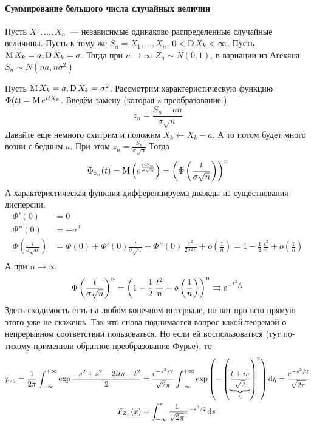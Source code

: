\documentclass[12pt,ebook]{../../../notes}
\begin{document}
\paragraph{Суммирование большого числа случайных величин}
\label{par:stat::randlimsum}
\flame\underdev\sour

\begin{thrm}\label{thrm:stat::randlimsum::sum}
  Пусть $X_1, \dotsc, X_n$~--- независимые одинаково распределённые случайные величины. Пусть к
  тому же $S_n = X_1, \dotsc, X_n$, $0 < \operatorname{D} X_k < \infty$.
  Пусть $\operatorname{M} X_k = a, \operatorname{D} X_k = \sigma$. Тогда при $n\to \infty$ $Z_n \sim N(0,1)$,
  в вариации из Агекяна $S_n \sim N(na,n\sigma^2)$
\end{thrm}
\begin{ittproof}
  Пусть $\operatorname{M} X_k = a, \operatorname{D} X_k = \sigma^2$.
  Рассмотрим характеристическую функцию $\Phi(t) = \operatorname{M} e^{itX_k}$. Введём замену (которая
  z-преобразование.):
  \[
    z_n = \frac{S_n - a n}{\sigma \sqrt n}
  \]
  Давайте ещё немного схитрим и положим $X_k \gets X_k- a$. А то потом будет много возни с бедным
  $a$. При этом $z_n = \frac{S_n}{\sigma \sqrt n}$
  Тогда
  \[
    \Phi_{z_n} (t) = \operatorname{M} \left(e^{\frac{itS_n}{\sigma\sqrt n}} \right)=
    \left(\Phi\left(\frac{t}{\sigma \sqrt n} \right)\right)^n 
  \]
  А характеристическая функция дифференцируема дважды из существования дисперсии.
  \begin{align*}
    \Phi'(0) &= 0 \\
    \Phi''(0) &= - \sigma^2 \\
    \Phi\left(\frac{t}{\sigma \sqrt n} \right) 
    &= \Phi(0) + \Phi'(0) \frac{t}{\sigma \sqrt n} + \Phi''(0)\, \frac{t^2}{2\sigma^2 n} 
      + o\left(\frac{1}{n}\right)
    = 1  - \frac{1}{2}\,\frac{t^2}{n} +  o\left(\frac{1}{n}\right) \\
  \end{align*}
  А при $n\to \infty$ \[
    \Phi\left(\frac{t}{\sigma \sqrt n} \right)^n 
    = \left(1  - \frac{1}{2}\,\frac{t^2}{n} +  o\left(\frac{1}{n}\right)\right) ^n
    \rightrightarrows e^{-{}^{t^2}\!/_{\!2}}
  \]
  Здесь сходимость есть на любом конечном интервале, но вот про всю прямую этого уже не скажешь.
  Так что снова поднимается вопрос какой теоремой о непрерывном соответствии пользоваться.
  Но если ей воспользоваться (тут по-тихому применили обратное преобразование Фурье), то
  \begin{align*}
    p_{z_n}= \frac{1}{2\pi} \int_{-\infty}^{+\infty} \exp{\frac{- s^2 + s^2 - 2its - t^2}{2}}  &=
    \frac{e^{-s^2/2}}{\sqrt{2}\pi } 
    \int_{-\infty}^{+\infty} \exp\left(-\left(\underbrace{\frac{t+is}{\sqrt 2}}_\eta \right)^2\right) \mathrm{d} \eta 
    =\frac{e^{-s^2/2}}{\sqrt{2\pi} } \\
    F_{Z_n} (x) &= \int_{-\infty}^x \frac{1}{\sqrt{2\pi}} e^{-s^2/2} \, \mathrm{d} s 
  \end{align*}


\end{ittproof}
\end{document}
